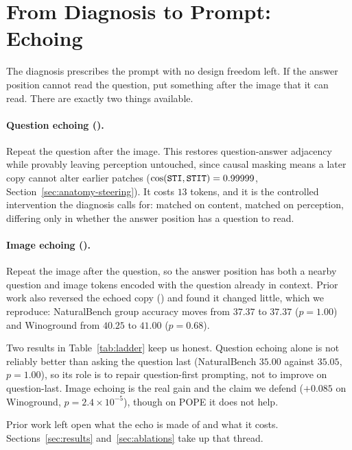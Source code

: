 \section{From Diagnosis to Prompt: Echoing}
\label{sec:echoing}

The diagnosis prescribes the prompt with no design freedom left. If the answer
position cannot read the question, put something after the image that it can
read. There are exactly two things available.

\paragraph{Question echoing (\stit{}).} Repeat the question after the image.
This restores question-answer adjacency while provably leaving perception
untouched, since causal masking means a later copy cannot alter earlier patches
($\cos(\texttt{STI}{}, \texttt{STIT}{}) = 0.99999$, Section~\ref{sec:anatomy-steering}). It
costs $13$ tokens, and it is the controlled intervention the diagnosis calls
for: matched on content, matched on perception, differing only in whether the
answer position has a question to read.

\paragraph{Image echoing (\sitit{}).} Repeat the image after the question, so
the answer position has both a nearby question and image tokens encoded with the
question already in context. Prior work also reversed the echoed copy
(\sititrev{}) and found it changed little, which we reproduce: NaturalBench
group accuracy moves from $37.37$ to $37.37$ ($p = 1.00$) and Winoground from
$40.25$ to $41.00$ ($p = 0.68$).

Two results in Table~\ref{tab:ladder} keep us honest. Question echoing alone is
not reliably better than asking the question last (NaturalBench $35.00$ against
$35.05$, $p = 1.00$), so its role is to repair question-first prompting, not to
improve on question-last. Image echoing is the real gain and the claim we defend
($+0.085$ on Winoground, $p = 2.4\times10^{-5}$), though on POPE it does not
help.

Prior work left open what the echo is made of and what it costs.
Sections~\ref{sec:results} and~\ref{sec:ablations} take up that thread.
